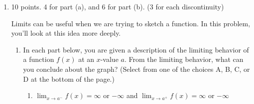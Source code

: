 \documentclass{article}
\begin{document}
\begin{enumerate}
\begin{enumerate}

  \end{enumerate}


\pspace{\newpage}

\item 

\begin{grading}
10 points. 4 for part (a), and 6 for part (b). (3 for each discontinuity)
\end{grading}


Limits can be useful when we are trying to sketch a function.
  In this problem, you'll look at this idea more deeply. 
  \begin{enumerate}
  \item In each part below, you are given a description of the
    limiting behavior of a function $f(x)$ at an $x$-value $a$.  From the limiting behavior, what
    can you conclude about the graph?  (Select from one of the
    choices A, B, C, or D at the bottom of the page.)

    \begin{enumerate}
    \item
      \begin{problem}[\vfill]
        $\displaystyle \lim_{x \to a^-} f(x) = \infty$ or $-\infty$ and
        $\displaystyle \lim_{x \to a^+} f(x) = \infty$ or $-\infty$
      \end{problem}


\end{enumerate}
\end{enumerate}
\end{enumerate}
\end{document}
